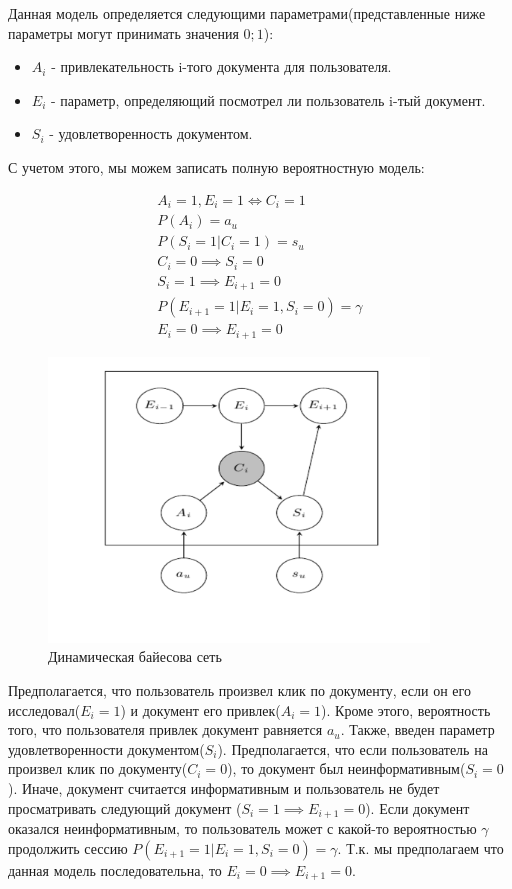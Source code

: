 Данная модель определяется следующими параметрами(представленные ниже параметры могут принимать значения ${0;1}$): 
\begin{itemize}
	\item $A_i$ - привлекательность i-того документа для пользователя. 
	\item $E_i$ - параметр, определяющий посмотрел ли пользователь i-тый документ. 
	\item $S_i$ - удовлетворенность документом.
\end{itemize}

С учетом этого, мы можем записать полную вероятностную модель:

\begin{subequations}
\begin{align}
	A_i=1,E_i=1 \iff  C_i=1 \\
	P(A_i)=a_u \\
	P(S_i=1|C_i=1)=s_u \\
	C_i=0 \implies S_i=0 \\
	S_i=1 \implies E_{i+1}=0 \\
	P(E_{i+1}=1|E_i=1,S_i=0)=\gamma \\
	E_i=0 \implies E_{i+1}=0 
\end{align}
\end{subequations}

\begin{figure}
  \centering
  \includegraphics[width=0.9\textwidth]{images/dbn.png}
  \caption{Динамическая байесова сеть\label{dbn-picture}}
\end{figure}

Предполагается, что пользователь произвел клик по документу, если он его исследовал($E_i=1$) и документ его привлек($A_i=1$). Кроме этого, вероятность того, что пользователя привлек документ равняется $a_u$. Также, введен параметр удовлетворенности документом($S_i$). Предполагается, что если пользователь на произвел клик по документу($C_i=0$), то документ был неинформативным($S_i=0$). Иначе, документ считается информативным и пользователь не будет просматривать следующий документ ($S_i=1 \implies E_{i+1}=0$). Если документ оказался неинформативным, то пользователь может с какой-то вероятностью $\gamma$ продолжить сессию $P(E_{i+1}=1|E_i=1,S_i=0)=\gamma$. Т.к. мы предполагаем что данная модель последовательна, то $E_i=0 \implies E_{i+1}=0$.

